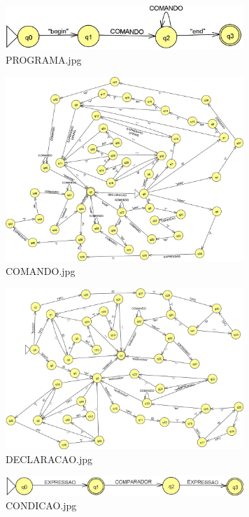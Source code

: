 \begin{figure}[H]
\centering
\includegraphics[width=9cm,keepaspectratio]{jflap-automatas/PROGRAMA.jpg}
\caption{\label{fig:programa-jflap} PROGRAMA.jpg}
\end{figure}

\begin{figure}[H]
\centering
\includegraphics[width=9cm,keepaspectratio]{jflap-automatas/COMANDO.jpg}
\caption{\label{fig:comando-jflap} COMANDO.jpg}
\end{figure}

\begin{figure}[H]
\centering
\includegraphics[width=9cm,keepaspectratio]{jflap-automatas/DECLARACAO.jpg}
\caption{\label{fig:declaracao-jflap} DECLARACAO.jpg}
\end{figure}

\begin{figure}[H]
\centering
\includegraphics[width=9cm,keepaspectratio]{jflap-automatas/CONDICAO.jpg}
\caption{\label{fig:condicao-jflap} CONDICAO.jpg}
\end{figure}

